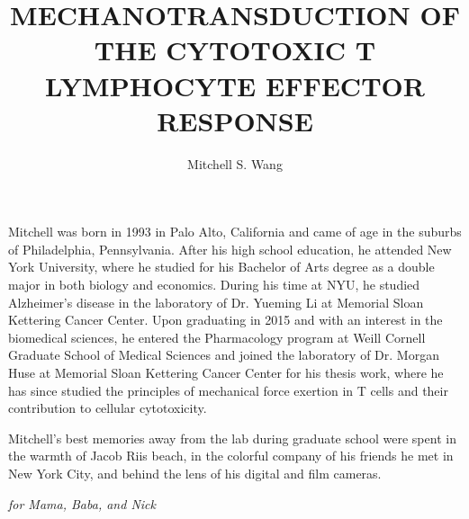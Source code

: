 \documentclass[phd,tocprelim]{cornell}
\title{MECHANOTRANSDUCTION OF THE CYTOTOXIC T LYMPHOCYTE  EFFECTOR RESPONSE}
\author {Mitchell S. Wang}
\begin{document}
\maketitle
\makecopyright

\begin{abstract}

\end{abstract}

\begin{biosketch}
Mitchell was born in 1993 in Palo Alto, California and came of age in the suburbs of Philadelphia, Pennsylvania. After his high school education, he attended New York University, where he studied for his Bachelor of Arts degree as a double major in both biology and economics. During his time at NYU, he studied Alzheimer’s disease in the laboratory of Dr. Yueming Li at Memorial Sloan Kettering Cancer Center. Upon graduating in 2015 and with an interest in the biomedical sciences, he entered the Pharmacology program at Weill Cornell Graduate School of Medical Sciences and joined the laboratory of Dr. Morgan Huse at Memorial Sloan Kettering Cancer Center for his thesis work, where he has since studied the principles of mechanical force exertion in T cells and their contribution to cellular cytotoxicity.

Mitchell's best memories away from the lab during graduate school were spent in the warmth of Jacob Riis beach, in the colorful company of his friends he met in New York City, and behind the lens of his digital and film cameras.
\end{biosketch}

\begin{dedication}
\emph{for Mama, Baba, and Nick}
\end{dedication}
\end{document}
